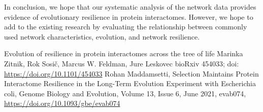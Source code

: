 \documentclass[12pt]{article}
\begin{document}
\indent In conclusion, we hope that our systematic analysis of the network data provides evidence of evolutionary resilience in protein interactomes. However, we hope to add to the existing research by evaluating the relationship between commonly used network characteristics, evolution, and network resilience. 

\begin{thebibliography}{1}
  Evolution of resilience in protein interactomes across the tree of life
Marinka Zitnik, Rok Sosič, Marcus W. Feldman, Jure Leskovec
bioRxiv 454033; doi: \url{https://doi.org/10.1101/454033}
 Rohan Maddamsetti, Selection Maintains Protein Interactome Resilience in the Long-Term Evolution Experiment with Escherichia coli, Genome Biology and Evolution, Volume 13, Issue 6, June 2021, evab074, \url{https://doi.org/10.1093/gbe/evab074}
  \end{thebibliography}

\end{document}
